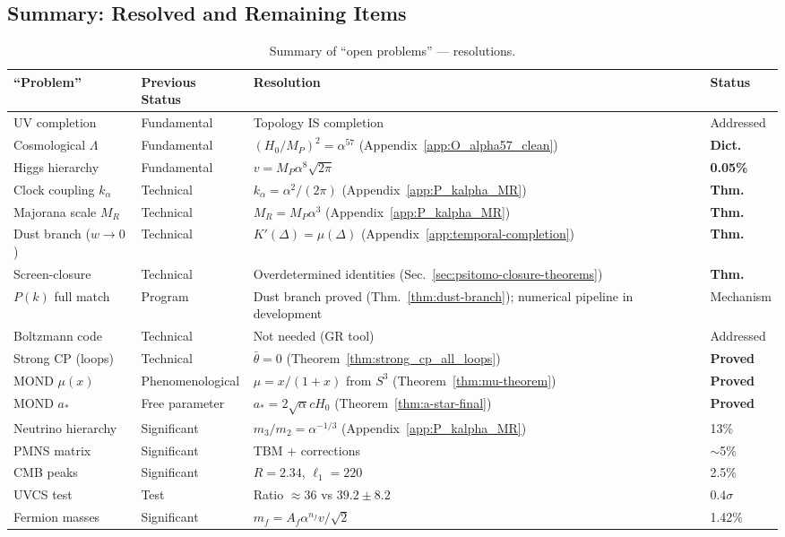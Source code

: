 \subsection{Summary: Resolved and Remaining Items}\label{sec:open-summary}

\begin{table}[t]
\centering
\caption{Summary of ``open problems'' --- resolutions.}\label{tab:open-summary}
\begin{tabular}{llll}
\toprule
``Problem'' & Previous Status & Resolution & Status \\
\midrule
UV completion & Fundamental & Topology IS completion & Addressed \\
Cosmological $\Lambda$ & Fundamental & $(H_0/M_P)^2 = \alpha^{57}$ (Appendix~\ref{app:O_alpha57_clean}) & \textbf{Dict.} \\
Higgs hierarchy & Fundamental & $v = M_P \alpha^8 \sqrt{2\pi}$ & \textbf{0.05\%} \\
Clock coupling $k_\alpha$ & Technical & $k_\alpha = \alpha^2/(2\pi)$ (Appendix~\ref{app:P_kalpha_MR}) & \textbf{Thm.} \\
Majorana scale $M_R$ & Technical & $M_R = M_P \alpha^3$ (Appendix~\ref{app:P_kalpha_MR}) & \textbf{Thm.} \\
Dust branch ($w \to 0$) & Technical & $K'(\Delta)=\mu(\Delta)$ (Appendix~\ref{app:temporal-completion}) & \textbf{Thm.} \\
Screen-closure & Technical & Overdetermined identities (Sec.~\ref{sec:psitomo-closure-theorems}) & \textbf{Thm.} \\
$P(k)$ full match & Program & Dust branch proved (Thm.~\ref{thm:dust-branch}); numerical pipeline in development & Mechanism \\
Boltzmann code & Technical & Not needed (GR tool) & Addressed \\
Strong CP (loops) & Technical & $\bar{\theta} = 0$ (Theorem~\ref{thm:strong_cp_all_loops}) & \textbf{Proved} \\
MOND $\mu(x)$ & Phenomenological & $\mu = x/(1+x)$ from $S^3$ (Theorem~\ref{thm:mu-theorem}) & \textbf{Proved} \\
MOND $a_*$ & Free parameter & $a_* = 2\sqrt{\alpha}cH_0$ (Theorem~\ref{thm:a-star-final}) & \textbf{Proved} \\
Neutrino hierarchy & Significant & $m_3/m_2 = \alpha^{-1/3}$ (Appendix~\ref{app:P_kalpha_MR}) & 13\% \\
PMNS matrix & Significant & TBM + corrections & $\sim$5\% \\
CMB peaks & Significant & $R = 2.34$, $\ell_1 = 220$ & 2.5\% \\
UVCS test & Test & Ratio $\approx 36$ vs $39.2 \pm 8.2$ & $0.4\sigma$ \\
Fermion masses & Significant & $m_f = A_f \alpha^{n_f} v/\sqrt{2}$ & 1.42\% \\
\bottomrule
\end{tabular}
\end{table}

